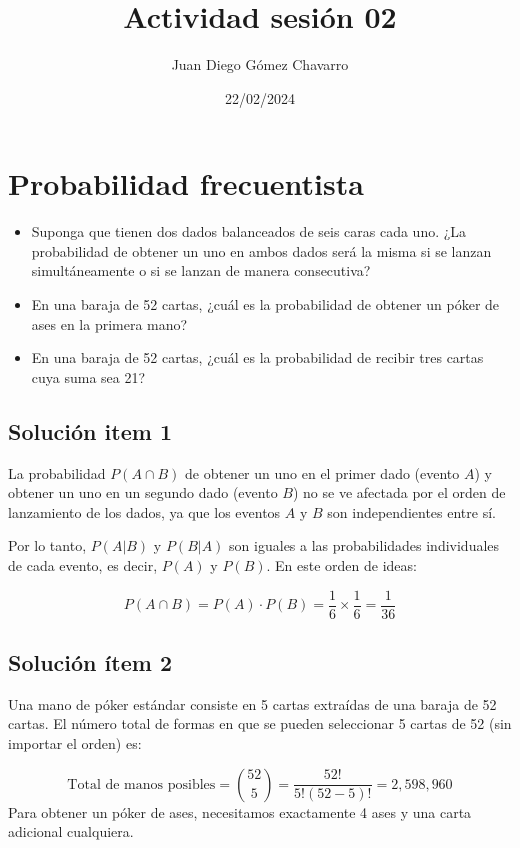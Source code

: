 \documentclass[a4paper,12pt]{article}
\title{Actividad sesi\'on 02}
\author{Juan Diego G\'omez Chavarro}
\date{22/02/2024}
\begin{document}
	
	\maketitle
	
	\section{Probabilidad frecuentista}
	
	\begin{itemize}
		\item Suponga que tienen dos dados balanceados de seis caras cada uno. ¿La probabilidad de obtener un uno en ambos dados será la misma si se lanzan simultáneamente o si se lanzan de manera consecutiva?
		\item En una baraja de 52 cartas, ¿cuál es la probabilidad de obtener un póker de ases en la primera mano?
		\item En una baraja de 52 cartas, ¿cuál es la probabilidad de recibir tres cartas cuya suma sea 21?
	\end{itemize}
	
	
	\subsection{Soluci\'on item 1}
	
	La probabilidad \( P(A \cap B) \) de obtener un uno en el primer dado (evento \( A \)) y obtener un uno en un segundo dado (evento \( B \)) no se ve afectada por el orden de lanzamiento de los dados, ya que los eventos \( A \) y \( B \) son independientes entre sí.
	
	Por lo tanto, \( P(A|B) \) y \( P(B|A) \) son iguales a las probabilidades individuales de cada evento, es decir, \( P(A) \) y \( P(B) \). En este orden de ideas:
	
	\[
	P(A \cap B) = P(A) \cdot P(B) = \frac{1}{6} \times \frac{1}{6} = \frac{1}{36}
	\]
	
	
	
	\subsection{Solución ítem 2}
	
	Una mano de póker estándar consiste en 5 cartas extraídas de una baraja de 52 cartas. El número total de formas en que se pueden seleccionar 5 cartas de 52 (sin importar el orden) es:
	
	\begin{equation}
		\text{Total de manos posibles} = \binom{52}{5} = \frac{52!}{5!(52-5)!} = 2,598,960
	\end{equation}
	Para obtener un póker de ases, necesitamos exactamente 4 ases y una carta adicional cualquiera.
	
\end{document}
